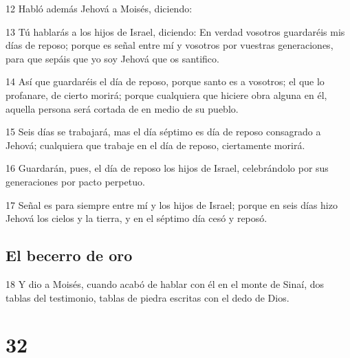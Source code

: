 \par 12 Habló además Jehová a Moisés, diciendo:
\par 13 Tú hablarás a los hijos de Israel, diciendo: En verdad vosotros guardaréis mis días de reposo; porque es señal entre mí y vosotros por vuestras generaciones, para que sepáis que yo soy Jehová que os santifico.
\par 14 Así que guardaréis el día de reposo, porque santo es a vosotros; el que lo profanare, de cierto morirá; porque cualquiera que hiciere obra alguna en él, aquella persona será cortada de en medio de su pueblo.
\par 15 Seis días se trabajará, mas el día séptimo es día de reposo consagrado a Jehová; cualquiera que trabaje en el día de reposo, ciertamente morirá.
\par 16 Guardarán, pues, el día de reposo los hijos de Israel, celebrándolo por sus generaciones por pacto perpetuo.
\par 17 Señal es para siempre entre mí y los hijos de Israel; porque en seis días hizo Jehová los cielos y la tierra, y en el séptimo día cesó y reposó.

\section*{El becerro de oro}

\par 18 Y dio a Moisés, cuando acabó de hablar con él en el monte de Sinaí, dos tablas del testimonio, tablas de piedra escritas con el dedo de Dios.

\chapter{32}

